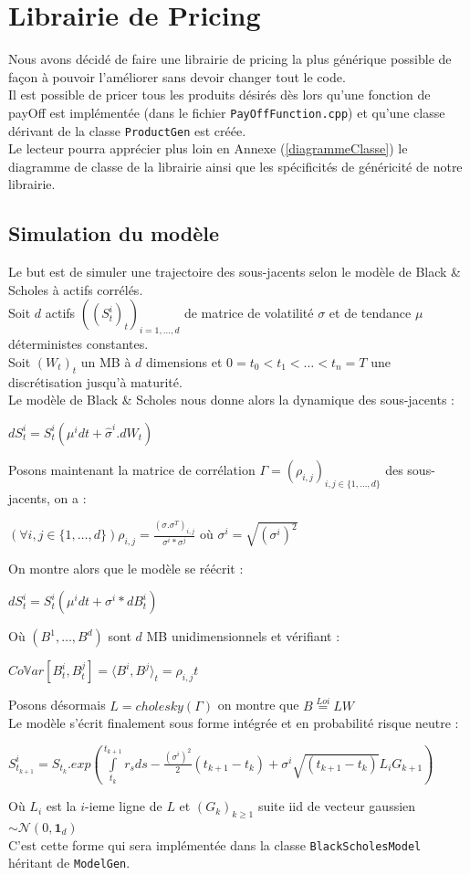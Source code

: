 \documentclass[a4paper,12pt]{article}
\begin{document}
\section{Librairie de Pricing}
Nous avons décidé de faire une librairie de pricing la plus générique possible de façon à pouvoir l'améliorer sans devoir changer tout le code. \\
Il est possible de pricer tous les produits désirés dès lors qu'une fonction de payOff est implémentée (dans le fichier {\tt PayOffFunction.cpp}) et qu'une classe dérivant de la classe {\tt ProductGen} est créée. \\
Le lecteur pourra apprécier plus loin en Annexe (\ref{diagrammeClasse}) le diagramme de classe de la librairie ainsi que les spécificités de généricité de notre librairie.
\subsection{Simulation du modèle}
Le but est de simuler une trajectoire des sous-jacents selon le modèle de Black \& Scholes à actifs corrélés. \\[2mm]
Soit $d$ actifs $((S^i_t)_t)_{i=1,\ldots,d}$ de matrice de volatilité $\sigma$ et de tendance $\mu$ déterministes constantes. \\
Soit $(W_t)_t$ un MB à $d$ dimensions et $0=t_0<t_1<\ldots<t_n=T$ une discrétisation jusqu'à maturité. \\
Le modèle de Black \& Scholes nous donne alors la dynamique des sous-jacents : 
\begin{center}
$dS^i_t=S^i_t\left(\mu^idt+\widehat{\sigma}^i.dW_t\right)$
\end{center} 
Posons maintenant la matrice de corrélation $\Gamma=\left(\rho_{i,j}\right)_{i,j\in\{1,\ldots,d\}}$ des sous-jacents, on a :
\begin{center}
$\left(\forall i,j \in \{1,\ldots,d\}\right) \rho_{i,j}=\frac{\left(\sigma.\sigma^T\right)_{i,j}}{\sigma^i*\sigma^j}$  où $\sigma^i = \sqrt{(\sigma^i)^2}$
\end{center}
On montre alors que le modèle se réécrit : 
\begin{center}
$dS^i_t=S^i_t\left(\mu^idt + \sigma^i * dB^i_t\right)$
\end{center}
Où $\left(B^1,\ldots,B^d\right)$ sont $d$ MB unidimensionnels et vérifiant : 
\begin{center}
$Co\mathbb{V}ar\left[B^i_t,B^j_t\right]=\langle B^i,B^j\rangle_t=\rho_{i,j}t$
\end{center}
Posons désormais $L=cholesky(\Gamma)$ on montre que $B\overset{Loi}{=}LW$ \\
Le modèle s'écrit finalement sous forme intégrée et en probabilité risque neutre : 
\begin{center}
$S^i_{t_{k+1}}=S_{t_k}.exp\left(\int\limits_{t_k}^{t_{k+1}}r_sds-\frac{(\sigma^i)^2}{2}\left(t_{k+1}-t_{k}\right)+\sigma^i\sqrt{\left(t_{k+1}-t_{k}\right)}L_iG_{k+1}\right)$
\end{center}
Où $L_i$ est la $i$-ieme ligne de $L$ et $\left(G_k\right)_{k\geq 1}$ suite iid de vecteur gaussien $\sim\mathcal{N}(0,\mathbf{1}_d)$ \\[2mm]
C'est cette forme qui sera implémentée dans la classe {\tt BlackScholesModel} héritant de {\tt ModelGen}.
\end{document}
